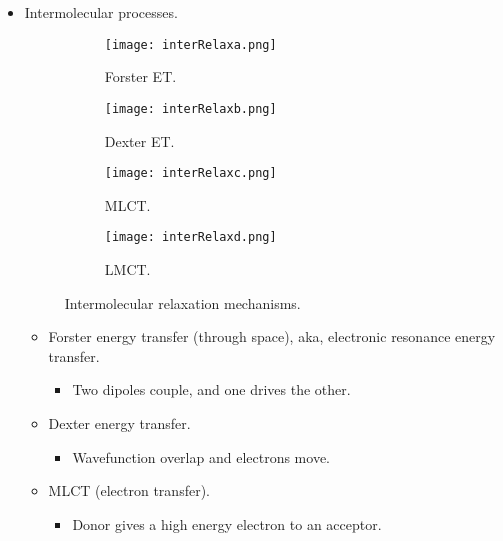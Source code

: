 \documentclass[../notes.tex]{subfiles}
\begin{document}
\begin{itemize}
\begin{itemize}
    \end{itemize}
    \item Intermolecular processes.
    \begin{figure}[h!]
        \centering
        \begin{subfigure}[b]{0.24\linewidth}
            \centering
            \texttt{[image: interRelaxa.png]}
            \caption{Forster ET.}
            \label{fig:interRelaxa}
        \end{subfigure}
        \begin{subfigure}[b]{0.24\linewidth}
            \centering
            \texttt{[image: interRelaxb.png]}
            \caption{Dexter ET.}
            \label{fig:interRelaxb}
        \end{subfigure}
        \begin{subfigure}[b]{0.24\linewidth}
            \centering
            \texttt{[image: interRelaxc.png]}
            \caption{MLCT.}
            \label{fig:interRelaxc}
        \end{subfigure}
        \begin{subfigure}[b]{0.24\linewidth}
            \centering
            \texttt{[image: interRelaxd.png]}
            \caption{LMCT.}
            \label{fig:interRelaxd}
        \end{subfigure}
        \caption{Intermolecular relaxation mechanisms.}
        \label{fig:interRelax}
    \end{figure}
    \begin{itemize}
        \item Forster energy transfer (through space), aka, electronic resonance energy transfer.
        \begin{itemize}
            \item Two dipoles couple, and one drives the other.
        \end{itemize}
        \item Dexter energy transfer.
        \begin{itemize}
            \item Wavefunction overlap and electrons move.
        \end{itemize}
        \item MLCT (electron transfer).
        \begin{itemize}
            \item Donor gives a high energy electron to an acceptor.
        \end{itemize}

\end{itemize}
\end{itemize}
\end{document}
